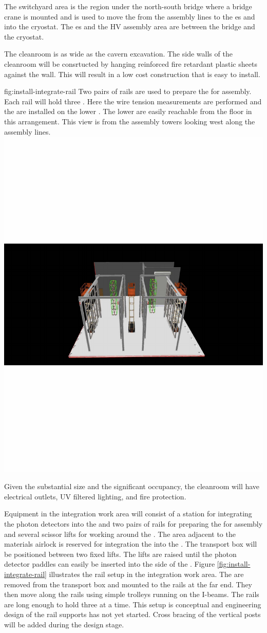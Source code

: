 The switchyard area is the region under the north-south bridge where a bridge crane is mounted and is used to move the  from the assembly lines to the \coldbox{}es and into the cryostat. The \coldbox{}es and the HV assembly area are between the bridge and the cryostat.


The cleanroom is as wide as the cavern excavation. The side walls of the cleanroom will be consrtucted by hanging reinforced fire retardant plastic sheets against the wall. This will result in a low cost construction that is easy to install.


\begin{dunefigure}{fig:install-integrate-rail}
  {Two pairs of rails are used to prepare the  for assembly. Each rail will hold three . Here the wire tension measurements are performed and the   are installed on the lower . The lower  are easily reachable from the floor in this arrangement. This view is from the assembly towers looking west along the assembly lines.}
\includegraphics[width=.5\textwidth]{graphics/install-integrate-rail.pdf}
\end{dunefigure}

Given the substantial size and the significant occupancy, the cleanroom will have electrical outlets, UV filtered lighting, and fire protection.

Equipment in the integration work area will consist of a station for integrating the photon detectors into the  and two pairs of rails for preparing the  for assembly and several scissor lifts for working around the . 
The area adjacent to the materials airlock is reserved for integration the  into the . 
The  transport box will be positioned between two fixed lifts. 
The lifts are raised until the photon detector paddles can easily be inserted into the side of the .
Figure \ref{fig:install-integrate-rail} illustrates the rail setup in the integration work area. 
The  are removed from the transport box and mounted to the rails at the far end. 
They then move along the rails using simple trolleys running on the I-beams. 
The rails are long enough to hold three  at a time. 
This setup is conceptual and engineering design of the rail supports has not yet started. 
Cross bracing of the vertical posts will be added during the design stage. 

